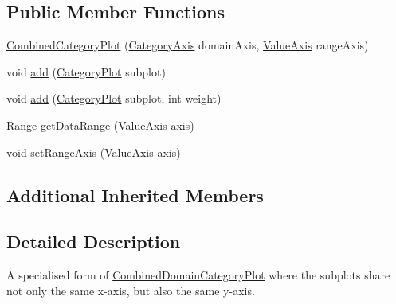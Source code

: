 \subsection*{Public Member Functions}
\begin{DoxyCompactItemize}
\item 
\mbox{\hyperlink{classorg_1_1jfree_1_1experimental_1_1chart_1_1plot_1_1_combined_category_plot_ac7103e90504be1793fddd3e6735e25fa}{Combined\+Category\+Plot}} (\mbox{\hyperlink{classorg_1_1jfree_1_1chart_1_1axis_1_1_category_axis}{Category\+Axis}} domain\+Axis, \mbox{\hyperlink{classorg_1_1jfree_1_1chart_1_1axis_1_1_value_axis}{Value\+Axis}} range\+Axis)
\item 
void \mbox{\hyperlink{classorg_1_1jfree_1_1experimental_1_1chart_1_1plot_1_1_combined_category_plot_a182e6a9e3855e25068af902f010e2c9a}{add}} (\mbox{\hyperlink{classorg_1_1jfree_1_1chart_1_1plot_1_1_category_plot}{Category\+Plot}} subplot)
\item 
void \mbox{\hyperlink{classorg_1_1jfree_1_1experimental_1_1chart_1_1plot_1_1_combined_category_plot_a2c7f54cb0bf115a0b8cb06aac1028962}{add}} (\mbox{\hyperlink{classorg_1_1jfree_1_1chart_1_1plot_1_1_category_plot}{Category\+Plot}} subplot, int weight)
\item 
\mbox{\hyperlink{classorg_1_1jfree_1_1data_1_1_range}{Range}} \mbox{\hyperlink{classorg_1_1jfree_1_1experimental_1_1chart_1_1plot_1_1_combined_category_plot_ab74684841e2fa76eec6cfd9e17a33153}{get\+Data\+Range}} (\mbox{\hyperlink{classorg_1_1jfree_1_1chart_1_1axis_1_1_value_axis}{Value\+Axis}} axis)
\item 
void \mbox{\hyperlink{classorg_1_1jfree_1_1experimental_1_1chart_1_1plot_1_1_combined_category_plot_a814943a14fbe98e5420ba54af22ef7d4}{set\+Range\+Axis}} (\mbox{\hyperlink{classorg_1_1jfree_1_1chart_1_1axis_1_1_value_axis}{Value\+Axis}} axis)
\end{DoxyCompactItemize}
\subsection*{Additional Inherited Members}


\subsection{Detailed Description}
A specialised form of \mbox{\hyperlink{classorg_1_1jfree_1_1chart_1_1plot_1_1_combined_domain_category_plot_afa7e0de4ae1afd5b80883b005b47ab44}{Combined\+Domain\+Category\+Plot}} where the subplots share not only the same x-\/axis, but also the same y-\/axis. 

